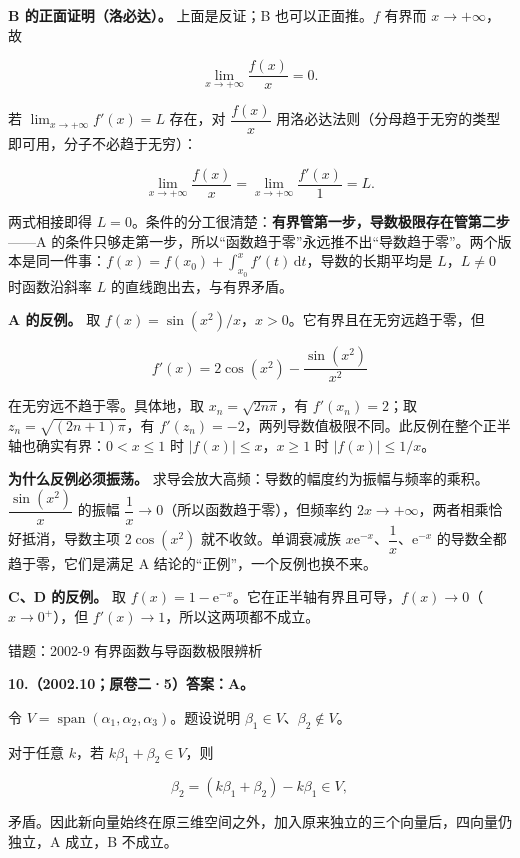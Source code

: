 \documentclass[UTF8,11pt,fontset=windows]{ctexart}
\begin{document}
\textbf{B 的正面证明（洛必达）。} 上面是反证；B 也可以正面推。$f$ 有界而 $x\to+\infty$，故

$$
\lim_{x\to+\infty}\frac{f(x)}{x}=0.
$$

若 $\lim_{x\to+\infty}f'(x)=L$ 存在，对 $\dfrac{f(x)}{x}$ 用洛必达法则（分母趋于无穷的类型即可用，分子不必趋于无穷）：

$$
\lim_{x\to+\infty}\frac{f(x)}{x}
=\lim_{x\to+\infty}\frac{f'(x)}{1}=L.
$$

两式相接即得 $L=0$。条件的分工很清楚：\textbf{有界管第一步，导数极限存在管第二步}——A 的条件只够走第一步，所以“函数趋于零”永远推不出“导数趋于零”。两个版本是同一件事：$f(x)=f(x_0)+\int_{x_0}^x f'(t)\,\mathrm dt$，导数的长期平均是 $L$，$L\ne0$ 时函数沿斜率 $L$ 的直线跑出去，与有界矛盾。

\textbf{A 的反例。} 取 $f(x)=\sin(x^2)/x$，$x>0$。它有界且在无穷远趋于零，但

$$
f'(x)=2\cos(x^2)-\frac{\sin(x^2)}{x^2}
$$

在无穷远不趋于零。具体地，取 $x_n=\sqrt{2n\pi}$，有 $f'(x_n)=2$；取 $z_n=\sqrt{(2n+1)\pi}$，有 $f'(z_n)=-2$，两列导数值极限不同。此反例在整个正半轴也确实有界：$0<x\le1$ 时 $|f(x)|\le x$，$x\ge1$ 时 $|f(x)|\le1/x$。

\textbf{为什么反例必须振荡。} 求导会放大高频：导数的幅度约为振幅与频率的乘积。$\dfrac{\sin(x^2)}{x}$ 的振幅 $\dfrac{1}{x}\to0$（所以函数趋于零），但频率约 $2x\to+\infty$，两者相乘恰好抵消，导数主项 $2\cos(x^2)$ 就不收敛。单调衰减族 $x\mathrm e^{-x}$、$\dfrac{1}{x}$、$\mathrm e^{-x}$ 的导数全都趋于零，它们是满足 A 结论的“正例”，一个反例也换不来。

\textbf{C、D 的反例。} 取 $f(x)=1-\mathrm e^{-x}$。它在正半轴有界且可导，$f(x)\to0$（$x\to0^+$），但 $f'(x)\to1$，所以这两项都不成立。

\begingroup\color{gray}错题：2002-9 有界函数与导函数极限辨析\par\endgroup

\clearpage

\textbf{10.（2002.10；原卷二·5）答案：A。}

令 $V=\operatorname{span}(\alpha_1,\alpha_2,\alpha_3)$。题设说明 $\beta_1\in V$、$\beta_2\notin V$。

对于任意 $k$，若 $k\beta_1+\beta_2\in V$，则

$$
\beta_2=(k\beta_1+\beta_2)-k\beta_1\in V,
$$

矛盾。因此新向量始终在原三维空间之外，加入原来独立的三个向量后，四向量仍独立，A 成立，B 不成立。
\end{document}
